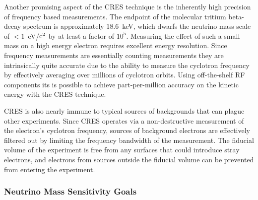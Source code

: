 Another promising aspect of the CRES technique is the inherently high precision of frequency based measurements. The endpoint of the molecular tritium beta-decay spectrum is approximately 18.6~keV, which dwarfs the neutrino mass scale of $<1$~eV/$\rm{c}^2$ by at least a factor of $10^5$. Measuring the effect of such a small mass on a high energy electron requires excellent energy resolution. Since frequency measurements are essentially counting measurements they are intrinsically quite accurate due to the ability to measure the cyclotron frequency by effectively averaging over millions of cyclotron orbits. Using off-the-shelf RF components its is possible to achieve part-per-million accuracy on the kinetic energy with the CRES technique.

CRES is also nearly immune to typical sources of backgrounds that can plague other experiments. Since CRES operates via a non-destructive measurement of the electron's cyclotron frequency, sources of background electrons are effectively filtered out by limiting the frequency bandwidth of the measurement. The fiducial volume of the experiment is free from any surfaces that could introduce stray electrons, and electrons from sources outside the fiducial volume can be prevented from entering the experiment.

\subsubsection*{Neutrino Mass Sensitivity Goals}


